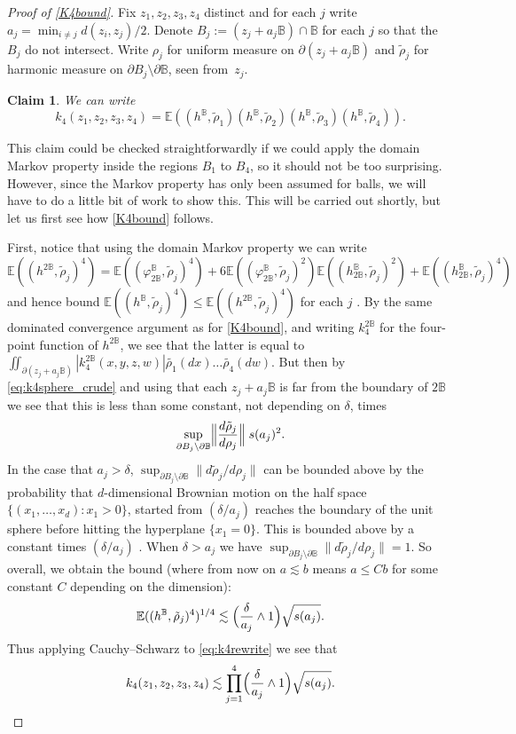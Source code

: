 \documentclass[10pt]{amsart}
\newtheorem{claim}[theorem]{Claim}
\theoremstyle{definition}
\newcommand{\E}{\mathbb{E}}
\newcommand{\B}{\mathbb{B}}\let\D\B\let\Ub\B
\begin{document}
\begin{proof}[Proof of \eqref{K4bound}] Fix $z_1,z_2,z_3,z_4$ distinct and for each $j$ write $a_j\!=\!\min_{i\ne j} d(z_i,z_j)/2$.
Denote $B_j:=(z_j+a_j\B)\cap \B$ for each $j$ so that the $B_j$ do not intersect. Write $\rho_j$ for uniform measure on $\partial(z_j+a_j\B)$ and $\tilde{\rho}_j$ for harmonic measure on $\partial B_j\setminus \partial \B$, seen from~$z_j$.

\begin{claim}\label{claim:4mt} We can write
\begin{equation}\label{eq:k4rewrite}k_4(z_1,z_2,z_3,z_4)=\E((h^\B,\tilde{\rho}_1)(h^\B,\tilde{\rho}_2)(h^\B,\tilde{\rho}_3)(h^\B,\tilde{\rho}_4)).\end{equation}
\end{claim}
 This claim could be checked straightforwardly if we could apply the domain Markov property inside the regions $B_1$ to $B_4$, so it should not be too surprising. However, since the Markov property has only been assumed for balls, we will have to do a little bit of work to show this. This will be carried out shortly, but let us first see how \eqref{K4bound} follows.

First, notice that using the domain Markov property we can write
\[
\E((h^{2\B},\tilde\rho_j)^4)=\E((\varphi^{\B}_{2\B},\tilde{\rho}_j)^4)+6\E((\varphi^{\B}_{2\B},\tilde{\rho}_j)^2)\E((h^\B_{2\B},\tilde{\rho}_j)^2)+\E((h^\B_{2\B},\tilde{\rho}_j)^4)
\]
and hence bound $\E((h^\B,\tilde{\rho}_j)^4)\le \E((h^{2\B},\tilde{\rho}_j)^4)$ for each $j$ . By the same dominated convergence argument as for \eqref{K4bound}, and writing $k_4^{2\B}$ for the four-point function of $h^{2\B}$, we see that the latter is equal to $\iint_{\partial (z_j+a_j\B)} |k_4^{2\B}(x,y,z,w)| \tilde{\rho_1}(dx)\dots \tilde{\rho_4}(dw)$. But then by \eqref{eq:k4sphere_crude} and using that each $z_j+a_j\B$ is far from the boundary of $2\B$ we see that this is less than some constant, not depending on $\delta$, times
\begin{equation}\label{density_sup}
\sup_{\partial B_j\setminus \partial \B} \Bigl\|\frac{d\tilde{\rho}_j}{d\rho_j}\Bigr\| \; s(a_j)^2.
\end{equation}
In the case that $a_j>\delta$, $\sup_{\partial B_j\setminus \partial \B} \|d\tilde{\rho}_j/d\rho_j\|$ can be bounded above by the probability that $d$-dimensional Brownian motion on the half space $\{(x_1,\dots, x_d): x_1>0\}$, started from $(\delta/a_j)$ reaches the boundary of the unit sphere before hitting the hyperplane $\{x_1=0\}$. This is bounded above by a constant times $(\delta/a_j)$ \cite[Th.\,4.4]{Burdzy}. When $\delta>a_j$ we have {$\sup_{\partial B_j\setminus \partial \B} \|d\tilde{\rho}_j/d\rho_j\|=1$}. So overall, we obtain the bound (where from now on $a\lesssim b$ means $a\le C b$ for some constant $C$ depending on the dimension):\vspace*{-3pt}
\[
\E((h^\B,\tilde{\rho}_j)^4)^{1/4}\lesssim \Bigl(\frac{\delta}{a_j}\wedge 1\Bigr)\sqrt{s(a_j)}.
\]
Thus applying Cauchy--Schwarz to \eqref{eq:k4rewrite} we see that\vspace*{-3pt}
\[
k_4(z_1,z_2,z_3,z_4)\lesssim \prod_{j=1}^4 \Bigl(\frac{\delta}{a_j}\wedge 1\Bigr) \sqrt{s(a_j)}.
\]


\end{proof}
\end{document}

